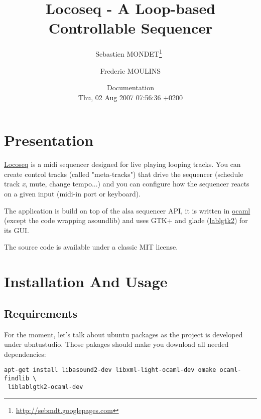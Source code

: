 

\title{Locoseq - A Loop-based Controllable Sequencer}
\author{Sebastien MONDET\thanks{\url{http://sebmdt.googlepages.com}}\ \and
Frederic MOULINS}

\date{Documentation\\
Thu, 02 Aug 2007 07:56:36 +0200}






\onecolumn
\maketitle
\tableofcontents

\section{Presentation}

\href{http://locosec.googlecode.com}{Locoseq} is a midi sequencer designed for
live playing looping tracks.  You can create control tracks (called
"meta-tracks") that drive the sequencer (schedule track \textit{x}, mute,
change tempo...) and you can configure how the sequencer reacts on a given
input (midi-in port or keyboard).


The application is build on top of the alsa sequencer API, it is written in
\href{http://www.ocaml.org}{ocaml}
(except the code wrapping asoundlib) and uses GTK+ and glade
(\href {http://wwwfun.kurims.kyoto-u.ac.jp/soft/lsl/lablgtk.html}{lablgtk2})
for its GUI.

The source code is available under a classic MIT license.



\section{Installation And Usage}

\subsection{Requirements}

For the moment, let's talk about ubuntu packages as the project is developed
under ubntustudio. Those pakages should make you download all needed
dependencies:

\begin{verbatim}
apt-get install libasound2-dev libxml-light-ocaml-dev omake ocaml-findlib \
 liblablgtk2-ocaml-dev
\end{verbatim}

